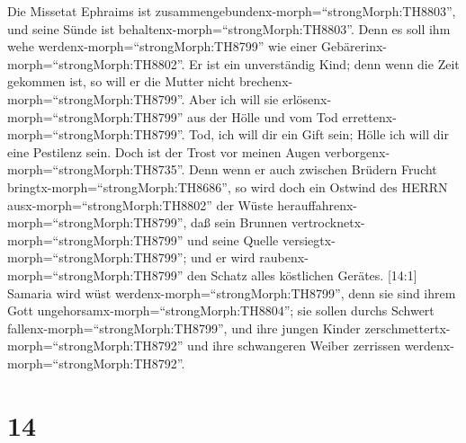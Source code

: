  Die Missetat Ephraims ist
zusammengebundenx-morph=``strongMorph:TH8803'', und seine Sünde ist
behaltenx-morph=``strongMorph:TH8803''.  Denn es soll ihm
wehe werdenx-morph=``strongMorph:TH8799'' wie einer
Gebärerinx-morph=``strongMorph:TH8802''. Er ist ein unverständig Kind;
denn wenn die Zeit gekommen ist, so will er die Mutter nicht
brechenx-morph=``strongMorph:TH8799''.  Aber ich will sie
erlösenx-morph=``strongMorph:TH8799'' aus der Hölle und vom Tod
errettenx-morph=``strongMorph:TH8799''. Tod, ich will dir ein Gift sein;
Hölle ich will dir eine Pestilenz sein. Doch ist der Trost vor meinen
Augen verborgenx-morph=``strongMorph:TH8735''.  Denn wenn
er auch zwischen Brüdern Frucht bringtx-morph=``strongMorph:TH8686'', so
wird doch ein Ostwind des HERRN ausx-morph=``strongMorph:TH8802'' der
Wüste herauffahrenx-morph=``strongMorph:TH8799'', daß sein Brunnen
vertrocknetx-morph=``strongMorph:TH8799'' und seine Quelle
versiegtx-morph=``strongMorph:TH8799''; und er wird
raubenx-morph=``strongMorph:TH8799'' den Schatz alles köstlichen
Gerätes.  {[}14:1{]} Samaria wird wüst
werdenx-morph=``strongMorph:TH8799'', denn sie sind ihrem Gott
ungehorsamx-morph=``strongMorph:TH8804''; sie sollen durchs Schwert
fallenx-morph=``strongMorph:TH8799'', und ihre jungen Kinder
zerschmettertx-morph=``strongMorph:TH8792'' und ihre schwangeren Weiber
zerrissen werdenx-morph=``strongMorph:TH8792''.

\hypertarget{section-13}{%
\section{14}\label{section-13}}


